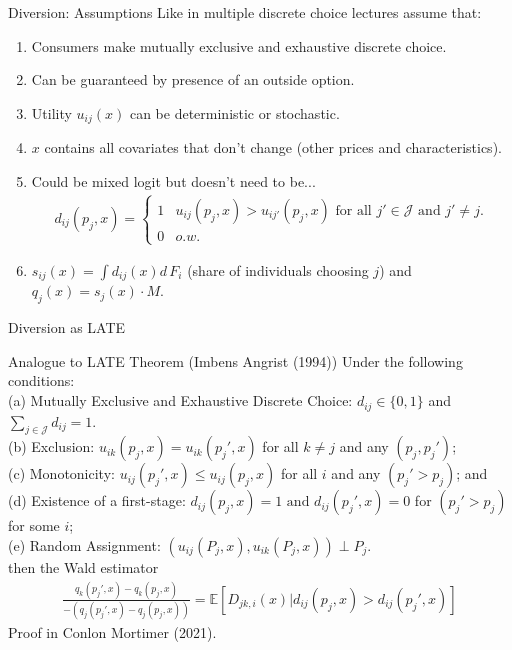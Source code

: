 \documentclass[xcolor=pdftex,dvipsnames,table,mathserif,aspectratio=169]{beamer}
\begin{document}
\begin{frame}{Diversion: Assumptions}
Like in multiple discrete choice lectures assume that:
\begin{enumerate}
\item Consumers make mutually exclusive and exhaustive \alert{discrete choice}.
\item Can be guaranteed by presence of an \alert{outside option}.
\item Utility $u_{ij}(x)$ can be \alert{deterministic} or \alert{stochastic}.
\item $x$ contains all covariates that don't change (other prices and characteristics).
\item Could be mixed logit but doesn't need to be...
\begin{align*}
d_{ij}(p_j,x) =\begin{cases} 
1 & u_{ij}(p_j,x) > u_{ij'}(p_j,x) \text{ for all }  j' \in \mathcal{J} \text{ and } j'\neq j.\\
0 & o.w.
 \end{cases}
 \end{align*}
\item $s_{ij }(x) = \int d_{ij}(x) d \, F_i$ (share of individuals choosing $j$) and $q_j(x)= s_j(x) \cdot M$.
\end{enumerate}
\end{frame}

\begin{frame}{Diversion as LATE}
\begin{block}{Analogue to LATE Theorem (Imbens Angrist (1994))}
Under the following conditions:\\ 
(a) Mutually Exclusive and Exhaustive Discrete Choice: $d_{ij} \in \{0,1\}$ and $\sum_{j \in \mathcal{J}} d_{ij}=1$.\\
(b) Exclusion: $u_{ik}(p_j,x)=u_{ik}(p_j',x)$ for all $k \neq j$ and any $(p_j, p_j')$; \\
(c) Monotonicity: $u_{ij}(p_j',x) \leq u_{ij}(p_j,x)$ for all $i$ and any $(p_j' > p_{j})$; and \\
(d) Existence of a first-stage: $d_{ij}(p_j,x) = 1 \text{ and } d_{ij}(p_j',x)=0$ for $(p_j' > p_{j})$ for some $i$; \\
(e) Random Assignment: $(u_{ij}(P_j,x),u_{ik}(P_j,x)) \perp P_j$. \\
\noindent
then the Wald estimator
\begin{align*}
 \frac{q_k(p_j',x) - q_k(p_j,x)}{-\left(q_j(p_j',x) - q_j(p_j,x)\right)}=\mathbb{E}[D_{jk,i}(x) | d_{ij}(p_j,x) > d_{ij}(p_j',x)]
\end{align*}
Proof in Conlon Mortimer (2021).
\end{block}
\end{frame}
\end{document}
